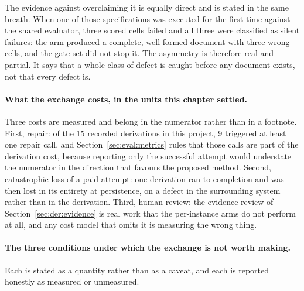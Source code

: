 The evidence against overclaiming it is equally direct and is stated in the same breath. When
one of those specifications was executed for the first time against the shared evaluator, three
scored cells failed and all three were classified as silent failures: the arm produced a
complete, well-formed document with three wrong cells, and the gate set did not stop it. The
asymmetry is therefore real and partial. It says that a whole class of defect is caught before
any document exists, not that every defect is.

\paragraph{What the exchange costs, in the units this chapter settled.}
Three costs are measured and belong in the numerator rather than in a footnote. First, repair:
of the 15 recorded derivations in this project, 9 triggered at least one repair call, and
Section~\ref{sec:eval:metrics} rules that those calls are part of the derivation cost, because
reporting only the successful attempt would understate the numerator in the direction that
favours the proposed method. Second, catastrophic loss of a paid attempt: one derivation ran to
completion and was then lost in its entirety at persistence, on a defect in the surrounding
system rather than in the derivation. Third, human review: the evidence review of
Section~\ref{sec:der:evidence} is real work that the per-instance arms do not perform at all,
and any cost model that omits it is measuring the wrong thing.

\paragraph{The three conditions under which the exchange is not worth making.}
Each is stated as a quantity rather than as a caveat, and each is reported honestly as measured
or unmeasured.

